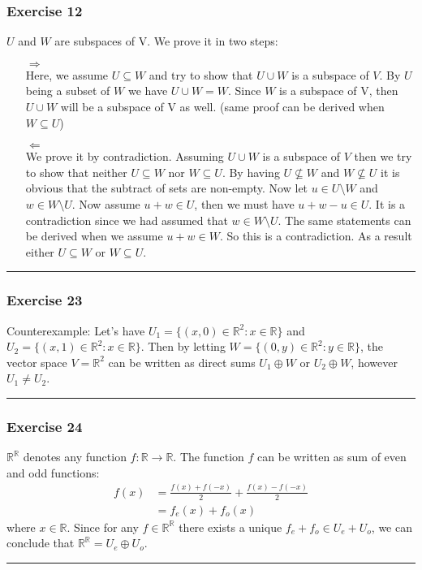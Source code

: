 \documentclass[12pt, letterpaper]{scrartcl}
\newcommand{\R}{\mathbb{R}}
\begin{document}
\subsubsection*{Exercise 12}
$U$ and $W$ are subspaces of V. We prove it in two steps:
\begin{itemize}
    \item[$\Longrightarrow$]\mbox{}\\
    Here, we assume $U\subseteq W$ and try to show that $U\cup W$ is a subspace of $V$. By $U$ being a subset of $W$ we have $U\cup W=W$. Since $W$ is a subspace of V, then $U\cup W$ will be a subspace of V as well. (same proof can be derived when $W\subseteq U$)
    
    \item[$\Longleftarrow$]\mbox{}\\
    We prove it by contradiction. Assuming $U\cup W$ is a subspace of $V$ then we try to show that neither $U\subseteq W$ nor $W\subseteq U$. By having $U\nsubseteq W$ and $W\nsubseteq U$ it is obvious that the subtract of sets are non-empty. Now let $u\in U\setminus W$ and $w\in W\setminus U$. Now assume $u+w\in U$, then we must have $u+w-u\in U$. It is a contradiction since we had assumed that $w\in W\setminus U$. The same statements can be derived when we assume $u+w\in W$. So this is a contradiction. As a result either $U\subseteq W$ or $W\subseteq U$.

\end{itemize}

\vskip1mm\hrule
\subsubsection*{Exercise 23}
Counterexample: Let's have $U_1=\{(x,0)\in \R^2: x\in \R\}$ and $U_2=\{(x,1)\in \R^2: x\in \R\}$. Then by letting $W=\{(0,y)\in \R^2: y\in \R\}$, the vector space $V=\R^2$ can be written as direct sums $U_1\oplus W$ or $U_2 \oplus W$, however $U_1\neq U_2$.
\vskip1mm\hrule
\subsubsection*{Exercise 24}
$\R^\R$ denotes any function $f:\R\rightarrow\R$. The function $f$ can be written as sum of even and odd functions:
\begin{align*}
    f(x)&=\frac{f(x)+f(-x)}{2} + \frac{f(x)-f(-x)}{2}\\
    &=f_e(x) + f_o(x)
\end{align*}
where $x\in \R$. Since for any $f\in\R^\R$ there exists a unique $f_e+f_o\in U_e+U_o$, we can conclude that $\R^\R=U_e\oplus U_o$.
\vskip1mm\hrule
\end{document}
